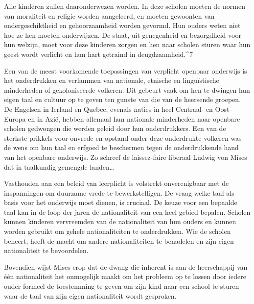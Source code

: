 \documentclass[
  a5paper,
  smalldemyvopaper,10pt,twoside,onecolumn,openright,extrafontsizes,hidelinks]{memoir}
\renewenvironment{quote}%
               {\list{}{\rightmargin=.6cm\leftmargin=.6cm}%
                \itshape \item[]}%
               {\endlist}
\begin{document}
\begin{quote}
Alle kinderen zullen daaronderwezen worden. In deze scholen moeten de
normen van moraliteit en religie worden aangeleerd, en moeten gewoonten
van ondergeschiktheid en gehoorzaamheid worden gevormd. Hun ouders weten
niet hoe ze hen moeten onderwijzen. De staat, uit genegenheid en
bezorgdheid voor hun welzijn, moet voor deze kinderen zorgen en hen naar
scholen sturen waar hun geest wordt verlicht en hun hart getraind in
deugdzaamheid.\^{}7
\end{quote}

Een van de meest voorkomende toepassingen van verplicht openbaar
onderwijs is het onderdrukken en verlammen van nationale, etnische en
linguïstische minderheden of gekoloniseerde volkeren. Dit gebeurt vaak
om hen te dwingen hun eigen taal en cultuur op te geven ten gunste van
die van de heersende groepen. De Engelsen in Ierland en Quebec, evenals
naties in heel Centraal- en Oost-Europa en in Azië, hebben allemaal hun
nationale minderheden naar openbare scholen gedwongen die werden geleid
door hun onderdrukkers. Een van de sterkste prikkels voor onvrede en
opstand onder deze onderdrukte volkeren was de wens om hun taal en
erfgoed te beschermen tegen de onderdrukkende hand van het openbare
onderwijs. Zo schreef de laissez-faire liberaal Ludwig von Mises dat in
taalkundig gemengde landen\ldots{}

\begin{quote}
Vasthouden aan een beleid van leerplicht is volstrekt onverenigbaar met
de inspanningen om duurzame vrede te bewerkstelligen. De vraag welke
taal als basis voor het onderwijs moet dienen, is cruciaal. De keuze
voor een bepaalde taal kan in de loop der jaren de nationaliteit van een
heel gebied bepalen. Scholen kunnen kinderen vervreemden van de
nationaliteit van hun ouders en kunnen worden gebruikt om gehele
nationaliteiten te onderdrukken. Wie de scholen beheert, heeft de macht
om andere nationaliteiten te benadelen en zijn eigen nationaliteit te
bevoordelen.
\end{quote}

Bovendien wijst Mises erop dat de dwang die inherent is aan de
heerschappij van één nationaliteit het onmogelijk maakt om het probleem
op te lossen door iedere ouder formeel de toestemming te geven om zijn
kind naar een school te sturen waar de taal van zijn eigen nationaliteit
wordt gesproken.
\end{document}
